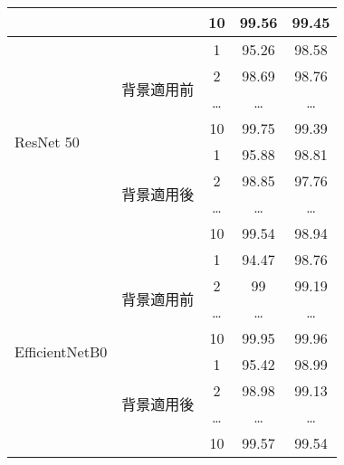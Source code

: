 \documentclass[a4paper,11pt,titlepage]{jsarticle}
\begin{document}
\begin{table}[htbp]
\begin{tabular}{|l|l|c|c|c|}
        & & 10 & 99.56 & 99.45 \\ %
        \hline
        \multirow{8}{*}{ResNet 50} & \multirow{4}{*}{背景適用前} & 1 & 95.26 & 98.58 \\
        & & 2 & 98.69 & 98.76 \\
        & & \dots & \dots & \dots \\
        & & 10 & 99.75 & 99.39 \\ %
        \cline{2-5}
        & \multirow{4}{*}{背景適用後} & 1 & 95.88 & 98.81 \\
        & & 2 & 98.85 & 97.76 \\
        & & \dots & \dots & \dots \\
        & & 10 & 99.54 & 98.94 \\ %
        \hline
        \multirow{8}{*}{EfficientNetB0} & \multirow{4}{*}{背景適用前} & 1 & 94.47 & 98.76 \\
        & & 2 & 99 & 99.19 \\
        & & \dots & \dots & \dots \\
        & & 10 & 99.95 & 99.96 \\ %
        \cline{2-5}
        & \multirow{4}{*}{背景適用後} & 1 & 95.42 & 98.99 \\
        & & 2 & 98.98 & 99.13 \\
        & & \dots & \dots & \dots \\
        & & 10 & 99.57 & 99.54 \\ %
        \hline
    \end{tabular}
\end{table}
\end{document}
